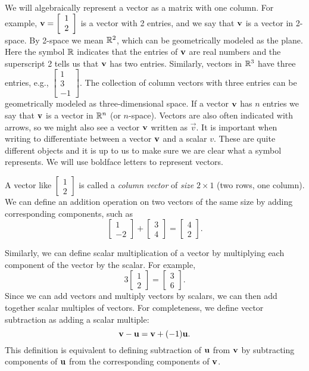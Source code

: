 We will algebraically represent a vector as a matrix with one column. For example, $\mathbf{v} = \left[ \begin{array}{c} 1\\ 2\end{array} \right]$ is a vector with 2 entries, and we say that $\mathbf{v}$ is a vector in 2-space. By 2-space we mean $\mathbb{R}^2$, which can be geometrically modeled as the plane. Here the symbol $\mathbb{R}$ indicates that the entries of $\mathbf{v}$ are real numbers and the superscript 2 tells us that $\mathbf{v}$ has two entries. Similarly, vectors in $\mathbb{R}^3$ have three entries, e.g., $\left[ \begin{array}{r} 1\\ 3\\ -1\end{array} \right]$. The collection of column vectors with three entries can be geometrically modeled as three-dimensional space. If a vector $\mathbf{v}$ has $n$ entries we say that $\mathbf{v}$ is a vector in $\mathbb{R}^n$ (or $n$-space). Vectors are also often indicated with arrows, so we might also see a vector $\mathbf{v}$ written as $\overrightarrow{v}$. It is important when writing to differentiate between a vector $\mathbf{v}$ and a scalar $v$. These are quite different objects and it is up to us to make sure we are clear what a symbol represents. We will use boldface letters to represent vectors.

A vector like $\left[ \begin{array}{c} 1\\ 2\end{array} \right]$ is called a \emph{column vector} of \emph{size} $2 \times 1$ (two rows, one column). We can define an addition operation on two vectors of the same size by adding corresponding components, such as 
\[\left[ \begin{array}{r} 1 \\ -2 \end{array} \right] + \left[ \begin{array}{c} 3 \\ 4 \end{array} \right] = \left[ \begin{array}{c} 4 \\ 2 \end{array} \right].\]


Similarly, we can define scalar multiplication of a vector by multiplying each component of the vector by the scalar. For example,
\[3\left[ \begin{array}{c} 1\\ 2\end{array} \right] = \left[ \begin{array}{c} 3\\ 6\end{array} \right].\]
Since we can add vectors and multiply vectors by scalars, we can then add together scalar multiples of vectors. For completeness, we define vector subtraction as adding a scalar multiple:
\[\mathbf{v} - \mathbf{u} = \mathbf{v} + (-1)\mathbf{u}.\]
This definition is equivalent to defining subtraction of $\mathbf{u}$ from $\mathbf{v}$ by subtracting components of $\mathbf{u}$ from the corresponding components of $\mathbf{v}$.

